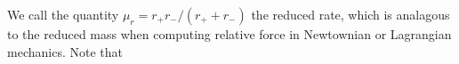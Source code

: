 We call the quantity \(\mu_r = r_+r_-/(r_+ + r_-)\) the reduced rate, which is analagous to the reduced mass when computing relative force in Newtownian or Lagrangian mechanics.  Note that